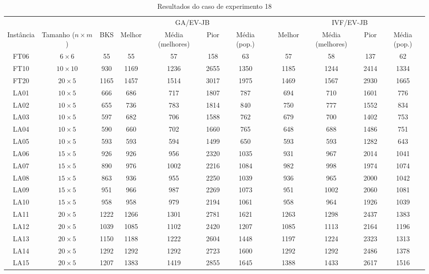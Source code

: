 \begin{sidewaystable}
\caption{Resultados do caso de experimento 18}
\centering
\label{experimento18}
\begin{tabular}{cccccccccccc}
\toprule
& & & \multicolumn{4}{c}{GA/EV-JB} & & \multicolumn{4}{c}{IVF/EV-JB} \\
\cmidrule(c){4-7}
\cmidrule(c){9-12}
Inst\^{a}ncia & Tamanho ($n \times m$) & BKS & Melhor & M\'{e}dia (melhores) & Pior & M\'{e}dia (pop.) & & Melhor & M\'{e}dia (melhores) & Pior & M\'{e}dia (pop.) \\
\midrule
FT06 & $6 \times 6$ & 55 & 55 & 57 & 158 & 63 & & 57 & 58 & 137 & 62 \\
FT10 & $10 \times 10$ & 930 & 1169 & 1236 & 2655 & 1350 & & 1185 & 1244 & 2414 & 1334 \\
FT20 & $20 \times 5$ & 1165 & 1457 & 1514 & 3017 & 1975 & & 1469 & 1567 & 2930 & 1665 \\
LA01 & $10 \times 5$ & 666 & 686 & 717 & 1807 & 787 & & 694 & 710 & 1601 & 776 \\
LA02 & $10 \times 5$ & 655 & 736 & 783 & 1814 & 840 & & 750 & 777 & 1552 & 834 \\
LA03 & $10 \times 5$ & 597 & 682 & 706 & 1588 & 762 & & 679 & 700 & 1402 & 753 \\
LA04 & $10 \times 5$ & 590 & 660 & 702 & 1660 & 765 & & 648 & 688 & 1486 & 751 \\
LA05 & $10 \times 5$ & 593 & 593 & 594 & 1499 & 650 & & 593 & 593 & 1282 & 643 \\
LA06 & $15 \times 5$ & 926 & 926 & 956 & 2320 & 1035 & & 931 & 967 & 2014 & 1041 \\
LA07 & $15 \times 5$ & 890 & 976 & 1002 & 2216 & 1084 & & 982 & 998 & 1974 & 1074 \\
LA08 & $15 \times 5$ & 863 & 936 & 955 & 2250 & 1039 & & 936 & 965 & 2000 & 1042 \\
LA09 & $15 \times 5$ & 951 & 966 & 987 & 2269 & 1073 & & 951 & 1002 & 2060 & 1081 \\
LA10 & $15 \times 5$ & 958 & 958 & 979 & 2194 & 1061 & & 958 & 964 & 1926 & 1039 \\
LA11 & $20 \times 5$ & 1222 & 1266 & 1301 & 2781 & 1621 & & 1263 & 1298 & 2437 & 1383 \\
LA12 & $20 \times 5$ & 1039 & 1085 & 1102 & 2420 & 1207 & & 1085 & 1113 & 2164 & 1196 \\
LA13 & $20 \times 5$ & 1150 & 1188 & 1222 & 2604 & 1448 & & 1197 & 1224 & 2323 & 1313 \\
LA14 & $20 \times 5$ & 1292 & 1292 & 1292 & 2723 & 1600 & & 1292 & 1292 & 2486 & 1378 \\
LA15 & $20 \times 5$ & 1207 & 1383 & 1419 & 2855 & 1645 & & 1388 & 1433 & 2617 & 1516 \\
\bottomrule
\end{tabular}
\end{sidewaystable}
